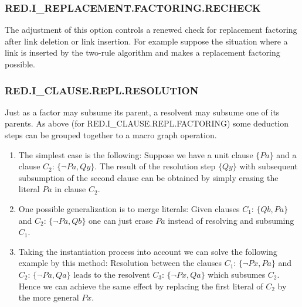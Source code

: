 
\PO





\subsubsection{RED.I\_REPLACEMENT.FACTORING.RECHECK}

The adjustment of this option controls a renewed check for replacement 
factoring after link deletion or link insertion. For example suppose the 
situation where a link is inserted by the two-rule algorithm and makes a 
replacement factoring possible. 

\PO
{}



\subsubsection{RED.I\_CLAUSE.REPL.RESOLUTION}
  

Just as a factor may subsume its parent, a resolvent may subsume one of 
its parents. As above (for RED.I\_CLAUSE.REPL.FACTORING) some 
deduction steps can be 
grouped together to a macro graph operation. 

\begin{enumerate}
\item The simplest case is 
the following:
Suppose we have a unit clause $\{Pa\}$ and a clause  $C_2$: $\{\neg Pa, Qy\}$.
The result of the resolution step $\{Qy\}$ with subsequent subsumption of
the second clause can be 
obtained by simply erasing the literal  $Pa$ in clause $C_2$.

\item One possible generalization is to merge literals: Given clauses
$C_1$: $\{Qb, Pa\}$ and $C_2$: $\{\neg Pa, Qb\}$ one can just erase $Pa$
instead of resolving and subsuming $C_1$.

\item Taking the instantiation process into account we can solve the 
following example by this method:
Resolution between the clauses $C_1$: $\{\neg Px, Pa\}$ and
$C_2$: $\{\neg Pa, Qa\}$ leads to the resolvent
$C_3$: $\{\neg Px, Qa\}$ which subsumes $C_2$. Hence we can achieve the same
effect by replacing the first literal of $C_2$
by the more general $Px$.
\end{enumerate}

